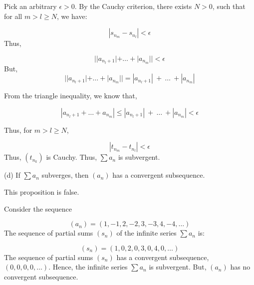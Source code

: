 \documentclass[10pt]{article}
\begin{document}
Pick an arbitrary $\displaystyle \epsilon  >0$. By the Cauchy criterion, there exists $\displaystyle N >0$, such that for all $\displaystyle m >l\geq N$, we have:


\begin{equation*}
|s_{n_{m}} -s_{n_{l}} |< \epsilon 
\end{equation*}
Thus,


\begin{equation*}
||a_{n_{l} +1} |+\dotsc +|a_{n_{m}} ||< \epsilon 
\end{equation*}
But, $ $
\begin{equation*}
||a_{n_{l} +1} |+\dotsc +|a_{n_{m}} ||=|a_{n_{l} +1} |\ +\ \dotsc \ +|a_{n_{m}} |
\end{equation*}


From the triangle inequality, we know that,


\begin{equation*}
|a_{n_{l} +1} +\dotsc +a_{n_{m}} |\leq |a_{n_{l} +1} |\ +\ \dotsc \ +|a_{n_{m}} |< \epsilon 
\end{equation*}


Thus, for $\displaystyle m >l\geq N$, 


\begin{equation*}
|t_{n_{m}} -t_{n_{l}} |< \epsilon 
\end{equation*}
Thus, $\displaystyle ( t_{n_{k}})$ is Cauchy. Thus, $\displaystyle \sum a_{n}$ is subvergent.



(d) If $\displaystyle \sum a_{n}$ subverges, then $\displaystyle ( a_{n})$ has a convergent subsequence.



This proposition is false.



Consider the sequence 


\begin{equation*}
( a_{n}) =( 1,-1,2,-2,3,-3,4,-4,\dotsc )
\end{equation*}
The sequence of partial sums $\displaystyle ( s_{n})$ of the infinite series $\displaystyle \sum a_{n}$ is:


\begin{equation*}
( s_{n}) =( 1,0,2,0,3,0,4,0,\dotsc )
\end{equation*}
The sequence of partial sums $\displaystyle ( s_{n})$ has a convergent subsequence, $\displaystyle ( 0,0,0,0,\dotsc )$. Hence, the infinite series $\displaystyle \sum a_{n}$ is subvergent. But, $\displaystyle ( a_{n})$ has no convergent subsequence.
\end{document}
